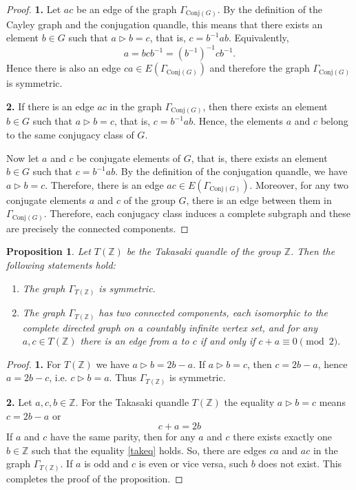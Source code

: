 \documentclass[english,11pt]{amsart}
\newtheorem{Proposition}[Theorem]{Proposition}
\begin{document}
\begin{proof}
{\bf 1.} Let $ac$ be an edge of the graph $\Gamma_{\mathrm{Conj}(G)}$.
By the definition of the Cayley graph and the conjugation quandle,
this means that there exists an element $b \in G$ such that $a \rhd b = c$, that is, $c=b^{-1}ab$. Equivalently,  $$a=bcb^{-1}=(b^{-1})^{-1}cb^{-1}.$$ Hence there is also an edge $ca \in E(\Gamma_{\mathrm{Conj}(G)})$ and therefore the graph   $\Gamma_{\mathrm{Conj}(G)}$ is symmetric. 

{\bf 2.} If there is an edge $ac$ in the graph $\Gamma_{\mathrm{Conj}(G)}$, then there exists
an element $b \in G$ such that $a \rhd b = c$, that is, $c = b^{-1}ab$. Hence, the elements $a$ and $c$ belong to the same conjugacy class of $G$.

Now let $a$ and $c$ be conjugate elements of $G$, that is, there exists an element $b \in G$ such that $c = b^{-1}ab$.
By the definition of the conjugation quandle, we have $a \rhd b = c$.
Therefore, there is an edge $ac \in E(\Gamma_{\mathrm{Conj}(G)})$.
Moreover, for any two conjugate elements $a$ and $c$ of the group $G$,
there is an edge between them in $\Gamma_{\mathrm{Conj}(G)}$.
Therefore, each conjugacy class induces a complete subgraph and these are precisely the connected components.
\end{proof}

\begin{Proposition}
\label{Takasaki}
  Let $T(\mathbb{Z})$ be the Takasaki quandle of the group  $\mathbb{Z}$. Then the following statements hold:
\begin{enumerate}
\item 
 The graph $\Gamma_{T(\mathbb{Z})}$ is symmetric.
 \item 
The graph  $\Gamma_{T(\mathbb{Z})}$ has two connected components, each isomorphic to the complete directed graph on a countably infinite vertex set, and for any $a,c \in T(\mathbb{Z})$ there is an edge from $a$ to $c$ if and only if $c+a \equiv 0 \pmod 2.$
\end{enumerate} 
\end{Proposition}

\begin{proof}
{\bf 1.} For $T(\mathbb Z)$ we have $a \rhd b = 2b-a$.
If $a \rhd b = c$, then $c=2b-a$, hence $a=2b-c$, i.e. $c \rhd b = a$.
Thus $\Gamma_{T(\mathbb Z)}$ is symmetric. 

{\bf 2.}
Let $a,c, b \in \mathbb{Z}$. For the Takasaki quandle $T(\mathbb{Z})$ the equality $a \rhd b = c$ means $c=2b-a$ or 
\begin{equation}
\label{takeq}
c+a=2b
\end{equation}
If $a$ and $c$ have the same parity, then for any $a$ and $c$ there exists exactly one $b \in \mathbb{Z}$ such that the equality \eqref{takeq} holds. So, there are edges $ca$ and $ac$ in the graph $\Gamma_{T(\mathbb{Z})}$. If $a$ is odd and $c$ is even or vice versa, such $b$ does not exist. This completes the proof of the proposition.
\end{proof}
\end{document}
